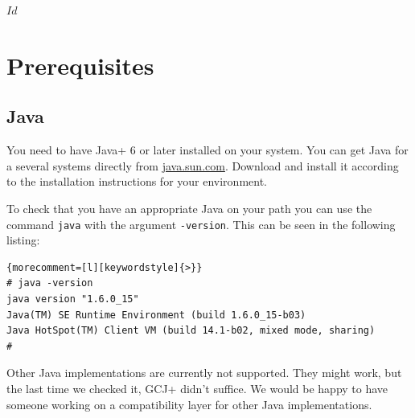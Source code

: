 \SVN$Id$
\chapter{Prerequisites}

\section{Java}

You need to have \+Java+ 6 or later installed on your system. You can
get Java for a several systems directly from \url{java.sun.com}.
Download and install it according to the installation instructions for
your environment.

To check that you have an appropriate Java on your path you can use
the command \texttt{java} with the argument \texttt{-version}. This
can be seen in the following listing:

%
\begin{lstlisting}{morecomment=[l][keywordstyle]{>}}
# java -version
java version "1.6.0_15"
Java(TM) SE Runtime Environment (build 1.6.0_15-b03)
Java HotSpot(TM) Client VM (build 14.1-b02, mixed mode, sharing)
#
\end{lstlisting}

Other Java implementations are currently not supported. They might
work, but the last time we checked it, \+GCJ+ didn't suffice. We would
be happy to have someone working on a compatibility layer for other
Java implementations.


